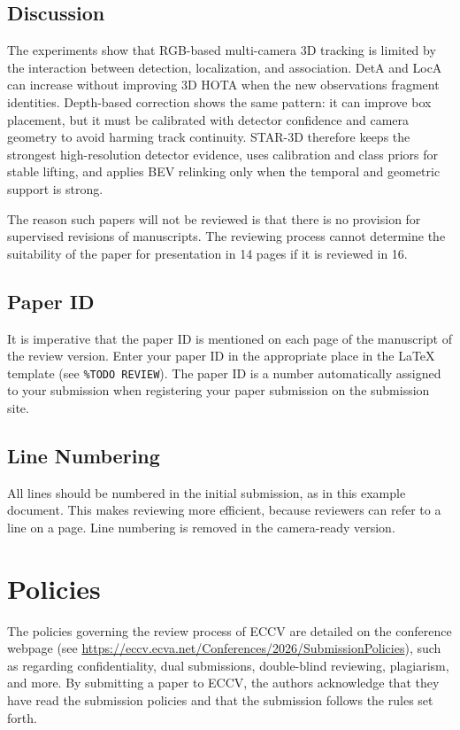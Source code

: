 \documentclass[runningheads]{llncs}
\begin{document}
\subsection{Discussion}
\label{sec:exp_discussion}

The experiments show that RGB-based multi-camera 3D tracking is limited by the
interaction between detection, localization, and association. DetA and LocA can
increase without improving 3D HOTA when the new observations fragment identities.
Depth-based correction shows the same pattern: it can improve box placement, but it
must be calibrated with detector confidence and camera geometry to avoid harming
track continuity. STAR-3D therefore keeps the strongest high-resolution detector
evidence, uses calibration and class priors for stable lifting, and applies BEV
relinking only when the temporal and geometric support is strong.

\iffalse
The reason such papers will not be reviewed is that there is no provision for supervised revisions of manuscripts. 
The reviewing process cannot determine the suitability of the paper for presentation in 14 pages if it is reviewed in 16.


\subsection{Paper ID}
It is imperative that the paper ID is mentioned on each page of the manuscript of the review version.
Enter your paper ID in the appropriate place in the \LaTeX{} template (see \texttt{\%TODO REVIEW}).
The paper ID is a number automatically assigned to your submission when registering your paper submission on the submission site.


\subsection{Line Numbering}
\label{sec:line-numbering}
All lines should be numbered in the initial submission, as in this example document. 
This makes reviewing more efficient, because reviewers can refer to a line on a page. 
Line numbering is removed in the camera-ready version.


\section{Policies}
The policies governing the review process of ECCV \ECCVyear{} are detailed on the conference webpage (see \url{ https://eccv.ecva.net/Conferences/2026/SubmissionPolicies}), such as regarding confidentiality, dual submissions, double-blind reviewing, plagiarism, and more. 
By submitting a paper to ECCV, the authors acknowledge that they have read the submission policies and that the submission follows the rules set forth.
\end{document}

